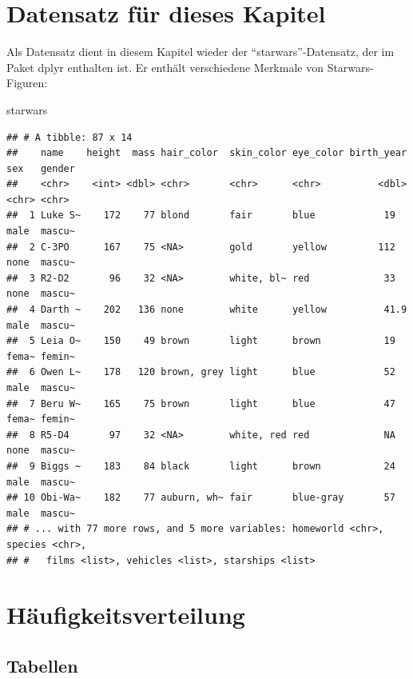 \documentclass[
]{book}
\newenvironment{Shaded}{\begin{snugshade}}{\end{snugshade}}
\newcommand{\NormalTok}[1]{#1}
\begin{document}
\hypertarget{datensatz-fuxfcr-dieses-kapitel}{%
\section{Datensatz für dieses Kapitel}\label{datensatz-fuxfcr-dieses-kapitel}}

Als Datensatz dient in diesem Kapitel wieder der ``starwars''-Datensatz, der im Paket dplyr enthalten ist. Er enthält verschiedene Merkmale von Starwars-Figuren:

\begin{Shaded}
\begin{Highlighting}[]
\NormalTok{starwars}
\end{Highlighting}
\end{Shaded}

\begin{verbatim}
## # A tibble: 87 x 14
##    name    height  mass hair_color  skin_color eye_color birth_year sex   gender
##    <chr>    <int> <dbl> <chr>       <chr>      <chr>          <dbl> <chr> <chr> 
##  1 Luke S~    172    77 blond       fair       blue            19   male  mascu~
##  2 C-3PO      167    75 <NA>        gold       yellow         112   none  mascu~
##  3 R2-D2       96    32 <NA>        white, bl~ red             33   none  mascu~
##  4 Darth ~    202   136 none        white      yellow          41.9 male  mascu~
##  5 Leia O~    150    49 brown       light      brown           19   fema~ femin~
##  6 Owen L~    178   120 brown, grey light      blue            52   male  mascu~
##  7 Beru W~    165    75 brown       light      blue            47   fema~ femin~
##  8 R5-D4       97    32 <NA>        white, red red             NA   none  mascu~
##  9 Biggs ~    183    84 black       light      brown           24   male  mascu~
## 10 Obi-Wa~    182    77 auburn, wh~ fair       blue-gray       57   male  mascu~
## # ... with 77 more rows, and 5 more variables: homeworld <chr>, species <chr>,
## #   films <list>, vehicles <list>, starships <list>
\end{verbatim}

\hypertarget{huxe4ufigkeitsverteilung}{%
\section{Häufigkeitsverteilung}\label{huxe4ufigkeitsverteilung}}

\hypertarget{tabellen}{%
\subsection{Tabellen}\label{tabellen}}
\end{document}

